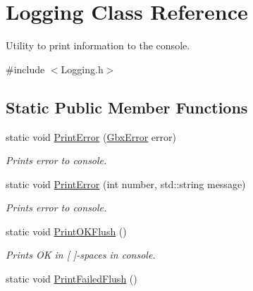 \hypertarget{classLogging}{\section{Logging Class Reference}
\label{classLogging}
}


Utility to print information to the console.  




{\ttfamily \#include $<$Logging.\-h$>$}

\subsection*{Static Public Member Functions}
\begin{DoxyCompactItemize}
\item 
static void \hyperlink{classLogging_a7d4e2168b879a66d322d0b4fb2b298c4}{Print\-Error} (\hyperlink{structGbxError}{Gbx\-Error} error)
\begin{DoxyCompactList}\small\item\em Prints error to console. \end{DoxyCompactList}\item 
static void \hyperlink{classLogging_ac1397db1b8ea6625f7dd2616f530cd7d}{Print\-Error} (int number, std\-::string message)
\begin{DoxyCompactList}\small\item\em Prints error to console. \end{DoxyCompactList}\item 
\hypertarget{classLogging_a889f2ad8f991afdf0959cb1cad736fa7}{static void \hyperlink{classLogging_a889f2ad8f991afdf0959cb1cad736fa7}{Print\-O\-K\-Flush} ()}\label{classLogging_a889f2ad8f991afdf0959cb1cad736fa7}

\begin{DoxyCompactList}\small\item\em Prints O\-K in \mbox{[} \mbox{]}-\/spaces in console. \end{DoxyCompactList}\item 
\hypertarget{classLogging_add0483bd14aef74ec988606cd7dbfc4b}{static void \hyperlink{classLogging_add0483bd14aef74ec988606cd7dbfc4b}{Print\-Failed\-Flush} ()}\label{classLogging_add0483bd14aef74ec988606cd7dbfc4b}


\end{DoxyCompactItemize}
